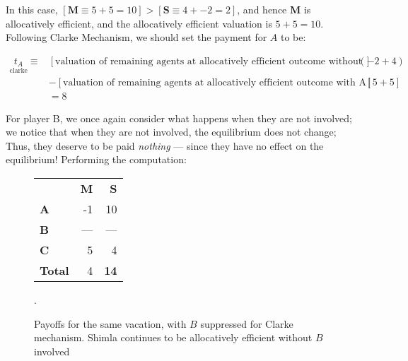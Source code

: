 \documentclass[10pt,a4paper]{article}
\begin{document}
In this case, $[\textbf{M} \equiv 5 + 5 = 10] > [\textbf{S} \equiv 4 + -2 = 2]$, and hence \textbf{M}
is allocatively efficient, and the allocatively efficient valuation is $5 + 5 =
10$.  Following Clarke Mechanism, we should set the payment for $A$ to be:

\begin{align*}
\underset{\text{clarke}}{t_A} \equiv &[\text{valuation of remaining agents at allocatively efficient outcome without A}](-2+4)  \\
     & - [\text{valuation of remaining agents at allocatively efficient outcome with A}][5+5] \\
     &= 8
\end{align*}


For player B, we once again consider what happens when they are not involved; we
notice that when they are not involved, the equilibrium does not change; Thus,
they deserve to be paid \emph{nothing} --- since they have no effect on the
equilibrium! Performing the computation:

\begin{figure}[H]
\begin{center}
\begin{tabular}{lrr}
              &  \textbf{M} &   \textbf{S} \\
\textbf{A}    & -1 &  10  \\
\textbf{B}    &  --- &  ---   \\
\textbf{C}    &  5 &  4  \\
\textbf{Total} & 4    &  \textbf{14}  \\
\end{tabular}
    \caption{Payoffs for the same vacation, with $B$ suppressed for Clarke mechanism. Shimla continues
        to be allocatively efficient without $B$ involved}.
\end{center}
\end{figure}

\nocite{*}


\end{document}
